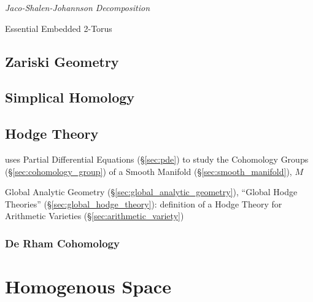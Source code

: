 \emph{Jaco-Shalen-Johannson Decomposition}

Essential Embedded 2-Torus



\subsection{Zariski Geometry}\label{sec:zariski_geometry}

\subsection{Simplical Homology}\label{sec:simplical_homology}

\subsection{Hodge Theory}\label{sec:hodge_theory}

uses Partial Differential Equations (\S\ref{sec:pde}) to study the Cohomology
Groups (\S\ref{sec:cohomology_group}) of a Smooth Manifold
(\S\ref{sec:smooth_manifold}), $M$

\fist Global Analytic Geometry (\S\ref{sec:global_analytic_geometry}), ``Global
Hodge Theories'' (\S\ref{sec:global_hodge_theory}): definition of a Hodge
Theory for Arithmetic Varieties (\S\ref{sec:arithmetic_variety})



\subsubsection{De Rham Cohomology}\label{sec:derham_cohomology}



\section{Homogenous Space}\label{sec:homogenous_space}

